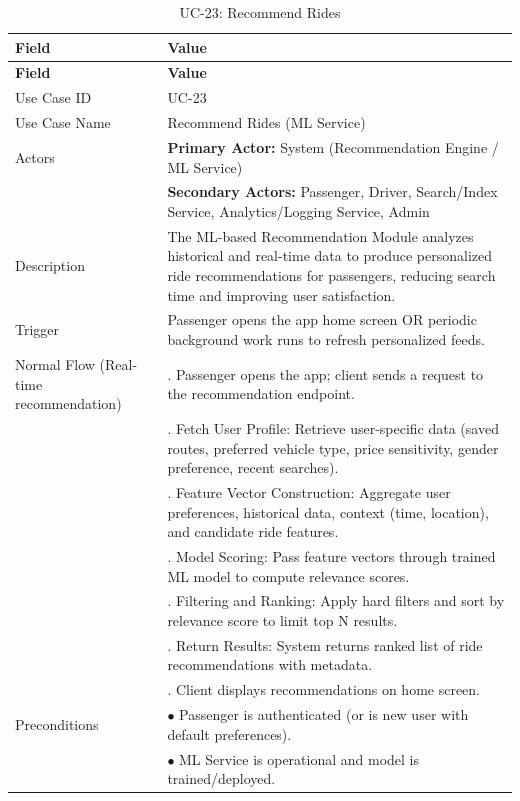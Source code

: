 \begin{longtable}{|>{\raggedright\arraybackslash}p{4cm}|>{\raggedright\arraybackslash}p{11cm}|}
\caption{UC-23: Recommend Rides}
\label{tab:uc-23} \\
\hline
\rowcolor{lightgray!30}
\textbf{Field} & \textbf{Value} \\
\hline
\endfirsthead
\hline
\rowcolor{lightgray!30}
\textbf{Field} & \textbf{Value} \\
\hline
\endhead
\hline
\endfoot
\hline
\endlastfoot
Use Case ID & UC-23 \\
\hline
Use Case Name & Recommend Rides (ML Service) \\
\hline
Actors & \textbf{Primary Actor:} System (Recommendation Engine / ML Service) \\
& \textbf{Secondary Actors:} Passenger, Driver, Search/Index Service, Analytics/Logging Service, Admin \\
\hline
Description & The ML-based Recommendation Module analyzes historical and real-time data to produce personalized ride recommendations for passengers, reducing search time and improving user satisfaction. \\
\hline
Trigger & Passenger opens the app home screen OR periodic background work runs to refresh personalized feeds. \\
\hline
Normal Flow (Real-time recommendation) & 1. Passenger opens the app; client sends a request to the recommendation endpoint. \\
& 2. Fetch User Profile: Retrieve user-specific data (saved routes, preferred vehicle type, price sensitivity, gender preference, recent searches). \\
& 3. Feature Vector Construction: Aggregate user preferences, historical data, context (time, location), and candidate ride features. \\
& 4. Model Scoring: Pass feature vectors through trained ML model to compute relevance scores. \\
& 5. Filtering and Ranking: Apply hard filters and sort by relevance score to limit top N results. \\
& 6. Return Results: System returns ranked list of ride recommendations with metadata. \\
& 7. Client displays recommendations on home screen. \\
\hline
Preconditions & $\bullet$ Passenger is authenticated (or is new user with default preferences). \\
& $\bullet$ ML Service is operational and model is trained/deployed. \\

\end{longtable}
